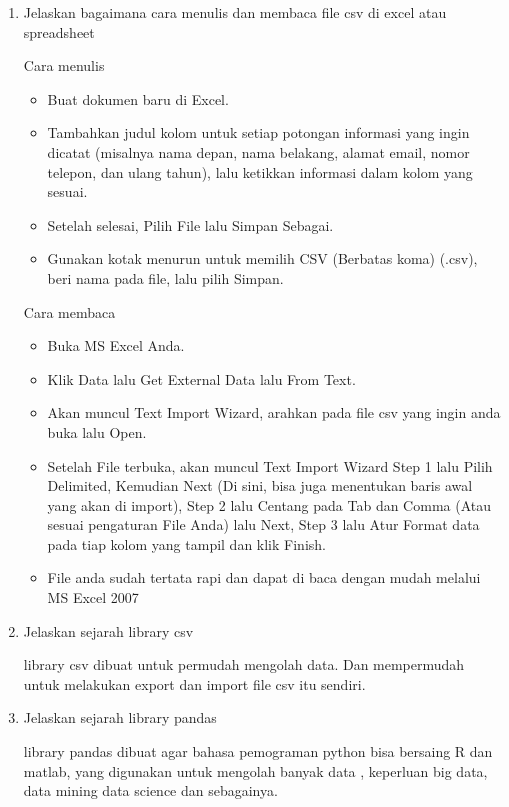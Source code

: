 \begin{enumerate}
    \item Jelaskan bagaimana cara menulis dan membaca file csv di excel atau spreadsheet
        \par Cara menulis
        \begin{itemize}
        \item Buat dokumen baru di Excel.
        \item Tambahkan judul kolom untuk setiap potongan informasi yang ingin dicatat (misalnya nama depan, nama belakang, alamat email, nomor telepon, dan ulang tahun), lalu ketikkan informasi dalam kolom yang sesuai.
        \item Setelah selesai, Pilih File lalu Simpan Sebagai.
        \item Gunakan kotak menurun untuk memilih CSV (Berbatas koma) (.csv), beri nama pada file, lalu pilih Simpan.
    \end{itemize}
    \par Cara membaca
    \begin{itemize}
        \item Buka MS Excel Anda.
        \item Klik Data lalu Get External Data lalu From Text.
        \item Akan muncul Text Import Wizard, arahkan pada file csv yang ingin anda buka lalu Open.
        \item Setelah File terbuka, akan muncul Text Import Wizard Step 1 lalu Pilih Delimited, Kemudian Next (Di sini, bisa juga menentukan baris awal yang akan di import), Step 2 lalu Centang pada Tab dan Comma (Atau sesuai pengaturan File Anda) lalu Next, Step 3 lalu Atur Format data pada tiap kolom yang tampil dan klik Finish.
        \item File anda sudah tertata rapi dan dapat di baca dengan mudah melalui MS Excel 2007
    \end{itemize}
    
    \item Jelaskan sejarah library csv
    \par library csv dibuat untuk permudah mengolah data. Dan mempermudah untuk melakukan export dan import file csv itu sendiri.
    
    \item Jelaskan sejarah library pandas
    \par library pandas dibuat agar bahasa pemograman python bisa bersaing R dan matlab, yang digunakan untuk mengolah banyak data , keperluan big data, data mining data science dan sebagainya.
    

\end{enumerate}
